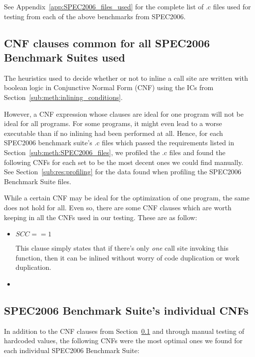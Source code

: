 See Appendix~\ref{app:SPEC2006_files_used} for the complete list of .c files
used for testing from each of the above benchmarks from SPEC2006.

\subsection{CNF clauses common for all SPEC2006 Benchmark Suites used}
\label{sub:meth:comon_CNFs}

The heuristics used to decide whether or not to inline a call site are written
with boolean logic in Conjunctive Normal Form (CNF) using the ICs from
Section~\ref{sub:meth:inlining_conditions}.

However, a CNF expression whose clauses are ideal for one program will not be
ideal for all programs. For some programs, it might even lead to a worse
executable than if no inlining had been performed at all. Hence, for each
SPEC2006 benchmark suite's .c files which passed the requirements listed in
Section~\ref{sub:meth:SPEC2006_files}, we profiled the .c files and found the
following CNFs for each set to be the most decent ones we could find manually.
See Section~\ref{sub:res:profiling} for the data found when profiling the
SPEC2006 Benchmark Suite files.

While a certain CNF may be ideal for the optimization of one program, the same
does not hold for all. Even so, there are some CNF clauses which are worth
keeping in all the CNFs used in our testing. These are as follow:

\begin{itemize}
	\item $SCC == 1$

This clause simply states that if there's only \textit{one} call site invoking
this function, then it can be inlined without worry of code duplication or work
duplication.

	\item {}
\end{itemize}

\subsection{SPEC2006 Benchmark Suite's individual CNFs}
\label{sub:meth:SPEC2006_heuristics}

In addition to the CNF clauses from Section~\ref{sub:meth:comon_CNFs} and
through manual testing of hardcoded
values, the following CNFs were the most optimal ones we found for each
individual SPEC2006 Benchmark Suite:

